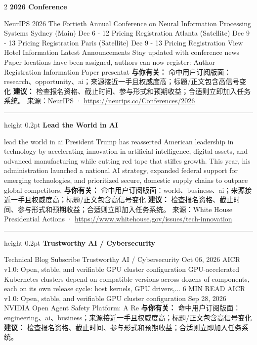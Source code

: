 \documentclass[10.5pt]{ctexart}
\begin{document}
\begin{multicols}{2}
{\large\bfseries 2026 Conference}\par
NeurIPS 2026 The Fortieth Annual Conference on Neural Information Processing Systems Sydney (Main) Dec 6 - 12 Pricing Registration Atlanta (Satellite) Dec 9 - 13 Pricing Registration Paris (Satellite) Dec 9 - 13 Pricing Registration View Hotel Information Latest Announcements Stay updated with conference news Paper locations have been assigned, authors can now register: Author Registration Information Paper presentat
\textbf{与你有关：} 命中用户订阅版面：research、opportunity、ai；来源接近一手且权威度高；标题/正文包含高信号变化
\textbf{建议：} 检查报名资格、截止时间、参与形式和预期收益；合适则立即加入任务系统。
{\footnotesize\color{ormuted} 来源：NeurIPS · \url{https://neurips.cc/Conferences/2026}}
\vspace{2mm}
\hrule height 0.2pt
\vspace{2mm}
{\large\bfseries Lead the World in AI}\par
lead the world in ai President Trump has reasserted American leadership in technology by accelerating innovation in artificial intelligence, digital assets, and advanced manufacturing while cutting red tape that stifles growth. This year, his administration launched a national AI strategy, expanded federal support for emerging technologies, and prioritized secure, domestic supply chains to outpace global competitors.
\textbf{与你有关：} 命中用户订阅版面：world、business、ai；来源接近一手且权威度高；标题/正文包含高信号变化
\textbf{建议：} 检查报名资格、截止时间、参与形式和预期收益；合适则立即加入任务系统。
{\footnotesize\color{ormuted} 来源：White House Presidential Actions · \url{https://www.whitehouse.gov/issues/tech-innovation}}
\vspace{2mm}
\hrule height 0.2pt
\vspace{2mm}
{\large\bfseries Trustworthy AI / Cybersecurity}\par
Technical Blog Subscribe Trustworthy AI / Cybersecurity Oct 06, 2026 AICR v1.0: Open, stable, and verifiable GPU cluster configuration GPU-accelerated Kubernetes clusters depend on compatible versions across dozens of components, each on its own release cycle: host kernels, GPU drivers,... 6 MIN READ AICR v1.0: Open, stable, and verifiable GPU cluster configuration Sep 28, 2026 NVIDIA Open Agent Safety Platform: A Re
\textbf{与你有关：} 命中用户订阅版面：engineering、ai、business；来源接近一手且权威度高；标题/正文包含高信号变化
\textbf{建议：} 检查报名资格、截止时间、参与形式和预期收益；合适则立即加入任务系统。

\end{multicols}
\end{document}
